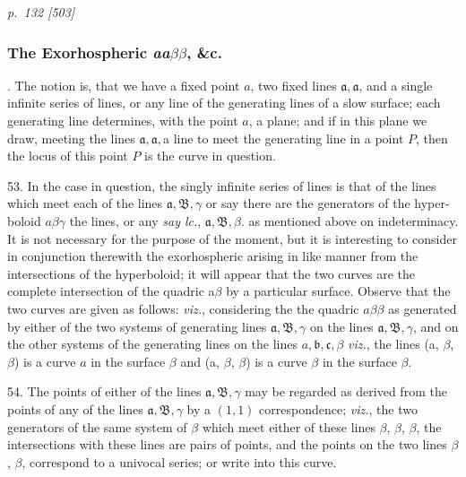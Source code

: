 \documentclass[11pt,a4paper]{book}
\begin{document}
\clearpage

\bigskip
\textit{p.~132 [503]}
\smallskip

\subsubsection*{The Exorhospheric \textit{aa}$\beta\beta$, \&c.}

. The notion is, that we have a fixed point $a$, two fixed lines $\mathfrak{a}, \mathfrak{a}$, and a
single infinite series of lines, or any line of the generating lines of a slow surface; each
generating line determines, with the point $a$, a plane; and if in this plane we draw,
meeting the lines $\mathfrak{a}, \mathfrak{a}, $a line to meet the generating line in a point $P$, then the
locus of this point $P$ is the curve in question.

53. In the case in question, the singly infinite series of lines is that of the lines
which meet each of the lines $\mathfrak{a}, \mathfrak{B}, \gamma$ or say there are the generators of the hyper-
boloid $a\beta\gamma$ the lines, or any \textit{say lc.}, $\mathfrak{a}, \mathfrak{B}, \beta$. as mentioned above on indeterminacy.
It is not necessary for the purpose of the moment, but it is interesting to consider in
conjunction therewith the exorhospheric arising in like manner from the intersections of
the hyperboloid; it will appear that the two curves are the complete intersection of
the quadric a$\beta$ by a particular surface. Observe that the two curves are given as
follows: \textit{viz.}, considering the the quadric $a\beta\beta$ as generated by either of the two systems
of generating lines $\mathfrak{a}, \mathfrak{B}, \gamma$ on the lines $\mathfrak{a}, \mathfrak{B}, \gamma$, and on the other systems
of the generating lines on the lines $a, \mathfrak{b}, \mathfrak{c}, \beta$ \textit{viz.}, the lines (a, $\beta$, $\beta$) is a curve
$a$ in the surface $\beta$ and (a, $\beta$, $\beta$) is a curve $\beta$ in the surface $\beta$.

54. The points of either of the lines $\mathfrak{a}, \mathfrak{B}, \gamma$ may be regarded as derived from
the points of any of the lines $\mathfrak{a}, \mathfrak{B}, \gamma$ by a $(1, 1)$ correspondence; \textit{viz.}, the two
generators of the same system of $\beta$ which meet either of these lines $\beta$, $\beta$, $\beta$, the
intersections with these lines are pairs of points, and the points on the two lines $\beta$, $\beta$,
correspond to a univocal series; or write into this curve.
\end{document}
